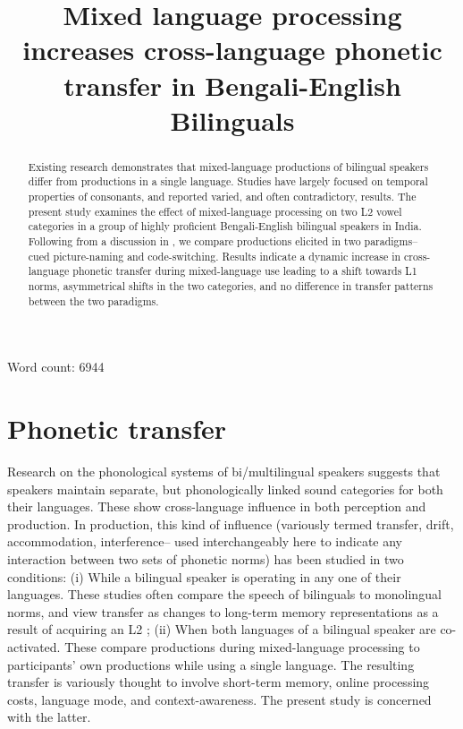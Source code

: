 \documentclass[charis,linguex]{glossa}
\title{Mixed language processing increases cross-language phonetic transfer in Bengali-English Bilinguals}
\author[Auromita \& Indranil]%
{%
  \spauthor{Auromita Mitra\\ 
  \institute{The EFL University}\\
  \small{%
  auromita.mitra@gmail.com}
  }
  \AND
  \spauthor{Indranil Dutta \\
  \institute{Jadavpur University}\\
  \small{%
  indranildutta.lnl@jadavpuruniversity.in}
  }%
}
\begin{document}
\sffamily
\maketitle

Word count: 6944

\begin{abstract}
Existing research demonstrates that mixed-language productions of bilingual speakers differ from productions in a single language. Studies have largely focused on temporal properties of consonants, and reported varied, and often contradictory, results. The present study examines the effect of mixed-language processing on two L2 vowel categories in a group of highly proficient Bengali-English bilingual speakers in India. Following from a discussion in \citep{olson2013bilingual}, we compare productions elicited in two paradigms-- cued picture-naming and code-switching. Results indicate a dynamic increase in cross-language phonetic transfer during mixed-language use leading to a shift towards L1 norms, asymmetrical shifts in the two categories, and no difference in transfer patterns between the two paradigms. 
\end{abstract}

\begin{keywords}
  
\end{keywords}

\rmfamily


\section{Phonetic transfer}

Research on the phonological systems of bi/multilingual speakers suggests that speakers maintain separate, but phonologically linked sound categories for both their languages. These show cross-language influence in both perception and production.
In production, this kind of influence (variously termed transfer, drift, accommodation, interference-- used interchangeably here to indicate any interaction between two sets of phonetic norms) has been studied in two conditions:
(i) While a bilingual speaker is operating in any one of their languages. These studies often compare the speech of bilinguals to monolingual norms, and view transfer as changes to long-term memory representations as a result of acquiring an L2 \citep{guion2003vowel,caramazza1973acquisition,flege1987production}; (ii) When both languages of a bilingual speaker are co-activated. These compare productions during mixed-language processing to participants' own productions while using a single language. The resulting transfer is variously thought to involve short-term memory, online processing costs, language mode, and context-awareness. The present study is concerned with the latter. 
\end{document}
